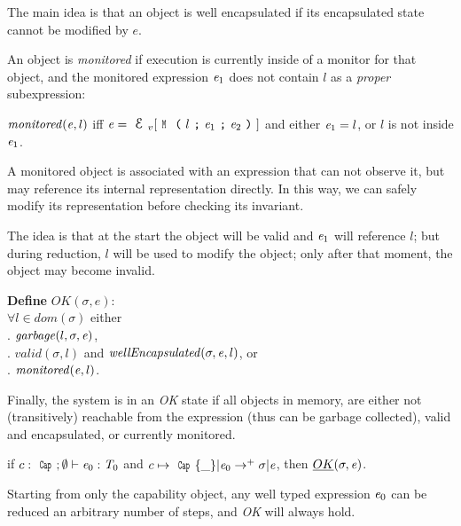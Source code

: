 \noindent The main idea is that an object is well encapsulated if its encapsulated state cannot be
modified by $e$.

An object is \emph{monitored} if execution
is currently inside of a monitor for that object, and
the monitored expression ${\mathit{e}}_1$ does not
contain $l$ as a \emph{proper} subexpression:

\indent $\mathit{monitored}({\mathit{e}},l)$ iff
$\e=\ctx_v[\M{l}{\e_1}{\e_2}]$ and either ${\mathit{e}}_1=l$, or $l$ is not inside ${\mathit{e}}_1$.%

\noindent A monitored object is associated with an expression that can not observe it, but may
reference its internal representation directly.
In this way, we can safely modify its representation before checking its invariant.

The idea is that at the start the object will be valid and ${\mathit{e}}_1$ will reference $l$;
but during reduction, $l$ will be used to
modify the object; only after that moment, the object may become invalid.


\noindent\textbf{Define} $\mathit{OK}(\sigma,e)$:\\
\indent $\forall l\in\textit{dom}(\sigma)$
  either\\
\indent{}. $\mathit{garbage}(l,\sigma,{\mathit{e}})$,\\
\indent{}. $\mathit{valid}(\sigma,l)$ and $\mathit{wellEncapsulated}(\sigma,{\mathit{e}},l)$, or\\
\indent{}. $\mathit{monitored}({\mathit{e}},l)$.

\noindent Finally, the system is in an \emph{OK} state
if all objects in memory, are either
not (transitively) reachable from the expression (thus can be garbage collected),
valid and encapsulated,
or currently monitored.

\begin{theorem}\rm
if $c:\Kw{Cap};\emptyset\vdash \e_0: \T_0$ and
$c\mapsto\Kw{Cap}\{\_\}|\e_0\rightarrow^+ \sigma|\e$, then
$\emph{OK}(\sigma,{\mathit{e}})$.
\end{theorem}
\noindent Starting from only the capability object,
any well typed expression ${\mathit{e}}_0$ can be reduced   an arbitrary number of steps,
and \emph{OK} will always hold.

